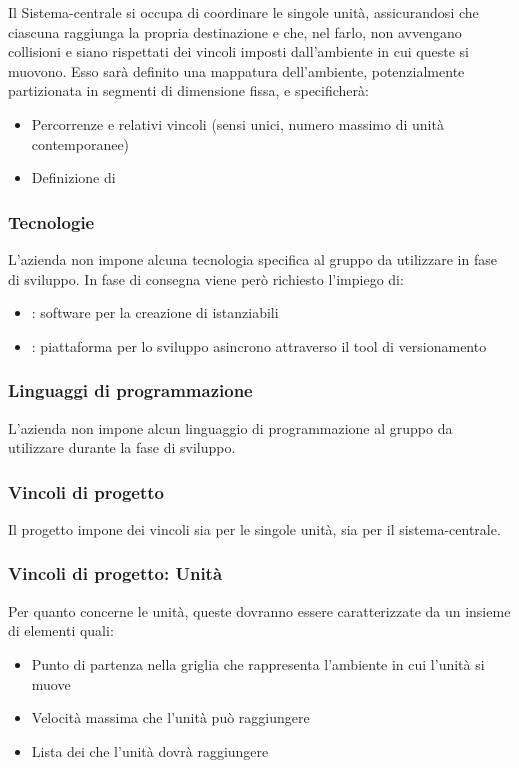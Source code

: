 \documentclass[]{article}
\begin{document}
			Il Sistema-centrale si occupa di coordinare le singole unità, assicurandosi che ciascuna raggiunga la propria destinazione e che, nel farlo, non avvengano collisioni e siano rispettati dei vincoli imposti dall'ambiente in cui queste si muovono.
			Esso sarà definito una mappatura dell'ambiente, potenzialmente partizionata in segmenti di dimensione fissa, e specificherà:
			\begin{itemize}
				\item Percorrenze e relativi vincoli (sensi unici, numero massimo di unità contemporanee)
				\item Definizione di 
			\end{itemize}
			
			\subsubsection{Tecnologie}
			L'azienda non impone alcuna tecnologia specifica al gruppo da utilizzare in fase di sviluppo.
			In fase di consegna viene però richiesto l'impiego di:
			\begin{itemize}
				\item \textsc{}: software per la creazione di  istanziabili
				\item \textsc{}: piattaforma per lo sviluppo asincrono attraverso il tool di versionamento 
			\end{itemize}
			
			\subsubsection{Linguaggi di programmazione}
			L'azienda non impone alcun linguaggio di programmazione al gruppo da utilizzare durante la fase di sviluppo.
			
	
			\subsubsection{Vincoli di progetto}
			Il progetto impone dei vincoli sia per le singole unità, sia per il sistema-centrale. \\
			\subsubsection{Vincoli di progetto: Unità}
			Per quanto concerne le unità, queste dovranno essere caratterizzate da un insieme di elementi quali:
			\begin{itemize}
				\item Punto di partenza nella griglia che rappresenta l'ambiente in cui l'unità si muove
				\item Velocità massima che l'unità può raggiungere
				\item Lista dei  che l'unità dovrà raggiungere
			\end{itemize}		 
		
\end{document}
